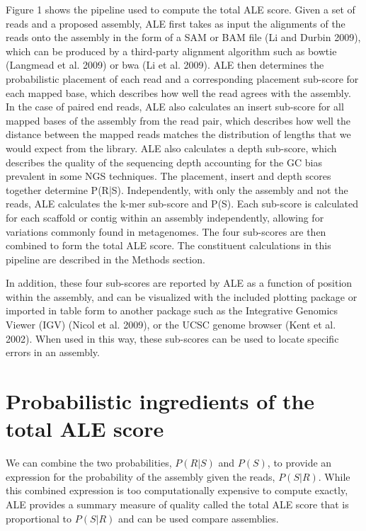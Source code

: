 \documentclass[phd,tocprelim]{cornell}
\begin{document}
Figure 1 shows the pipeline used to compute the total ALE score. Given a set of reads and a proposed assembly, ALE first takes as input the alignments of the reads onto the assembly in the form of a SAM or BAM file (Li and Durbin 2009), which can be produced by a third-party alignment algorithm such as bowtie (Langmead et al. 2009) or bwa (Li et al. 2009). ALE then determines the probabilistic placement of each read and a corresponding placement sub-score for each mapped base, which describes how well the read agrees with the assembly.  In the case of paired end reads, ALE also calculates an insert sub-score for all mapped bases of the assembly from the read pair, which describes how well the distance between the mapped reads matches the distribution of lengths that we would expect from the library.  ALE also calculates a depth sub-score, which describes the quality of the sequencing depth accounting for the GC bias prevalent in some NGS techniques.  The placement, insert and depth scores together determine P(R|S).  Independently, with only the assembly and not the reads, ALE calculates the k-mer sub-score and P(S). Each sub-score is calculated for each scaffold or contig within an assembly independently, allowing for variations commonly found in metagenomes. The four sub-scores are then combined to form the total ALE score. The constituent calculations in this pipeline are described in the Methods section.

In addition, these four sub-scores are reported by ALE as a function of position within the assembly, and can be visualized with the included plotting package or imported in table form to another package such as the Integrative Genomics Viewer (IGV) (Nicol et al. 2009), or the UCSC genome browser (Kent et al. 2002).  When used in this way, these sub-scores can be used to locate specific errors in an assembly.


\section{Probabilistic ingredients of the total ALE score} %
\label{sec:Probabilistic ingredients of the total ALE score}

We can combine the two probabilities, $P(R|S)$ and $P(S)$, to provide an expression for the probability of the assembly given the reads, $P(S|R)$.  While this combined expression is too computationally expensive to compute exactly, ALE provides a summary measure of quality called the total ALE score that is proportional to $P(S|R)$ and can be used compare assemblies.
\end{document}
